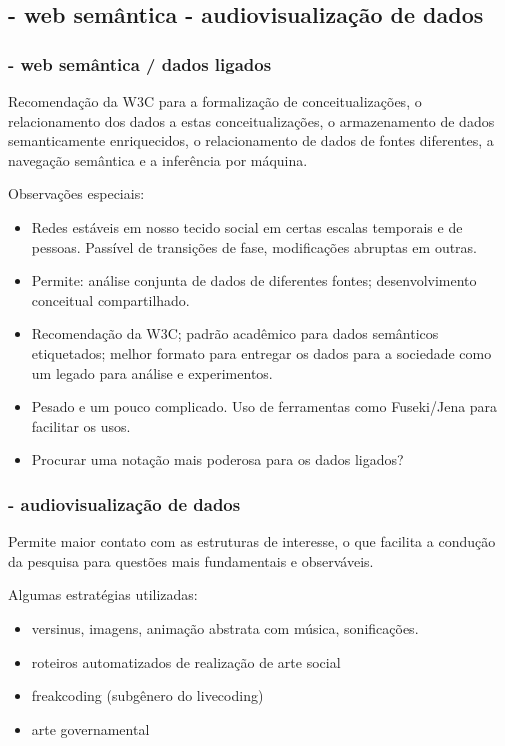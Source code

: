 \documentclass[10pt]{beamer}
\begin{document}
\begin{frame}
\subsection{- web semântica \;\; - audiovisualização de dados}
\frametitle{- web semântica / dados ligados}
	Recomendação da W3C para a formalização de conceitualizações, o relacionamento dos dados a estas conceitualizações, o armazenamento
	de dados semanticamente enriquecidos, o relacionamento de dados de fontes diferentes, a navegação semântica e a inferência por máquina.

	Observações especiais:
\begin{itemize}
	\item Redes estáveis em nosso tecido social em certas escalas temporais e de pessoas.
		Passível de transições de fase, modificações abruptas em outras.
	\item Permite: análise conjunta de dados de diferentes fontes; desenvolvimento conceitual compartilhado.
	\item Recomendação da W3C; padrão acadêmico para dados semânticos etiquetados; melhor formato para entregar os dados para a sociedade como um legado para análise e experimentos.
	\item Pesado e um pouco complicado. Uso de ferramentas como Fuseki/Jena para facilitar os usos.
	\item Procurar uma notação mais poderosa para os dados ligados?
\end{itemize}

\end{frame}
\begin{frame}
\frametitle{- audiovisualização de dados}
Permite maior contato com as estruturas de interesse,
o que facilita a condução da pesquisa para questões mais
fundamentais e observáveis.

Algumas estratégias utilizadas:
\begin{itemize}
	\item versinus, imagens, animação abstrata com música, sonificações.
	\item roteiros automatizados de realização de arte social
	\item freakcoding (subgênero do livecoding)
	\item arte governamental
\end{itemize}
\end{frame}
\end{document}
